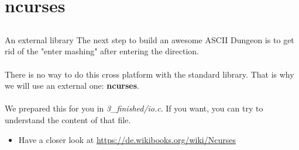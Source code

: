 \section{ncurses}
\subsection{}

\begin{frame}{An external library}
	The next step to build an awesome ASCII Dungeon is to get rid of the "enter mashing" after entering the direction.\\\ \\
	There is no way to do this cross platform with the standard library. That is why we will use an external one: \textbf{ncurses}.\\\ \\
	We prepared this for you in \textit{3\_finished/io.c}. If you want, you can try to understand the content of that file.
	\begin{itemize}
		\item Have a closer look at \url{https://de.wikibooks.org/wiki/Ncurses}
	\end{itemize}

\end{frame}


